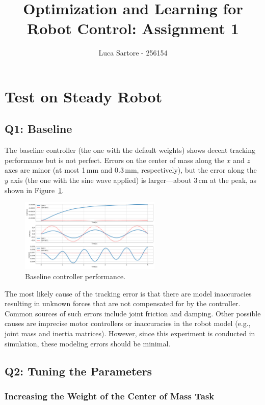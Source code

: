 \documentclass[12pt]{article}
\title{Optimization and Learning for Robot Control: Assignment 1}
\author{Luca Sartore - 256154}
\date{}
\begin{document}
\maketitle

\tableofcontents

\section{Test on Steady Robot}

\subsection{Q1: Baseline}

The baseline controller (the one with the default weights) shows decent tracking performance but is not perfect.
Errors on the center of mass along the $x$ and $z$ axes are minor (at most 1\,mm and 0.3\,mm, respectively), but the error along the $y$ axis (the one with the sine wave applied) is larger—about 3\,cm at the peak, as shown in Figure~\ref{fig:baseline}.

\begin{figure}[h!]
\centering
\includegraphics[width=0.6\textwidth]{./images/3.1.png}
\caption{Baseline controller performance.}
\label{fig:baseline}
\end{figure}

The most likely cause of the tracking error is that there are model inaccuracies resulting in unknown forces that are not compensated for by the controller.
Common sources of such errors include joint friction and damping.
Other possible causes are imprecise motor controllers or inaccuracies in the robot model (e.g., joint mass and inertia matrices).
However, since this experiment is conducted in simulation, these modeling errors should be minimal.

\subsection{Q2: Tuning the Parameters}

\subsubsection{Increasing the Weight of the Center of Mass Task}
\end{document}
